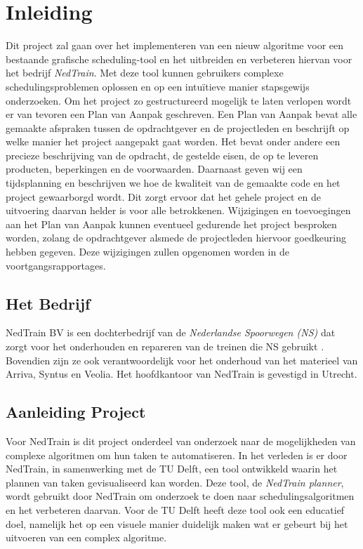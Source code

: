 \section{Inleiding}
Dit project zal gaan over het implementeren van een nieuw algoritme voor een bestaande grafische scheduling-tool en het uitbreiden en verbeteren hiervan voor het bedrijf \emph{NedTrain}. Met deze tool kunnen gebruikers complexe schedulingsproblemen oplossen en op een intu\"itieve manier stapsgewijs onderzoeken. Om het project zo gestructureerd mogelijk te laten verlopen wordt er van tevoren een Plan van Aanpak geschreven. Een Plan van Aanpak bevat alle gemaakte afspraken tussen de opdrachtgever en de projectleden en beschrijft op welke manier het project aangepakt gaat worden. Het bevat onder andere een precieze beschrijving van de opdracht, de gestelde eisen, de op te leveren producten, beperkingen en de voorwaarden. Daarnaast geven wij een tijdsplanning en beschrijven we hoe de kwaliteit van de gemaakte code en het project gewaarborgd wordt. Dit zorgt ervoor dat het gehele project en de uitvoering daarvan helder is voor alle betrokkenen. Wijzigingen en toevoegingen aan het Plan van Aanpak kunnen eventueel gedurende het project besproken worden, zolang de opdrachtgever alsmede de projectleden hiervoor goedkeuring hebben gegeven. Deze wijzigingen zullen opgenomen worden in de voortgangsrapportages.

\subsection{Het Bedrijf}
NedTrain BV is een dochterbedrijf van de \emph{Nederlandse Spoorwegen (NS)} dat zorgt voor het onderhouden en repareren van de treinen die NS gebruikt \cite{NedTrainSite}. Bovendien zijn ze ook verantwoordelijk voor het onderhoud van het materieel van Arriva, Syntus en Veolia. Het hoofdkantoor van NedTrain is gevestigd in Utrecht.

\subsection{Aanleiding Project}
Voor NedTrain is dit project onderdeel van onderzoek naar de mogelijkheden van complexe algoritmen om hun taken te automatiseren. In het verleden is er door NedTrain, in samenwerking met de TU Delft, een tool ontwikkeld waarin het plannen van taken gevisualiseerd kan worden. Deze tool, de \emph{NedTrain planner}, wordt gebruikt door NedTrain om onderzoek te doen naar schedulingsalgoritmen en het verbeteren daarvan. Voor de TU Delft heeft deze tool ook een educatief doel, namelijk het op een visuele manier duidelijk maken wat er gebeurt bij het uitvoeren van een complex algoritme.

